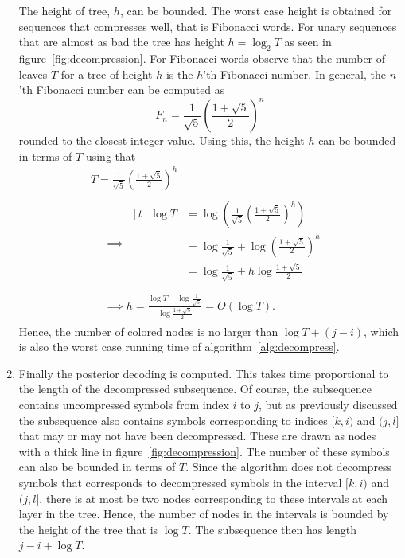\begin{enumerate}
  The height of tree, $h$, can be bounded. The worst case height is obtained
  for sequences that compresses well, that is Fibonacci words.  For unary
  sequences that are almost as bad the tree has height $h = \log_2 T$ as seen
  in figure~\ref{fig:decompression}. For Fibonacci words observe that the
  number of leaves $T$ for a tree of height $h$ is the $h$'th Fibonacci number.
  In general, the $n$'th Fibonacci number can be computed as
  \begin{equation*}
    F_n = \frac{1}{\sqrt{5}}
    {\left(
        \frac{1 + \sqrt{5}}{2}
      \right)}^n
  \end{equation*}
  rounded to the closest integer value. Using this, the height $h$ can be
  bounded in terms of $T$ using that
  \begin{gather*}
      T = \frac{1}{\sqrt{5}} {\left( \frac{1 + \sqrt{5}}{2} \right)}^h \\
      \begin{aligned}
        &\implies
        \begin{aligned}[t]
          \log T & = \log \left( \frac{1}{\sqrt{5}} {\left( \frac{1 + \sqrt{5}}{2} \right)}^h \right) \\
                 & = \log \frac{1}{\sqrt{5}} + \log {\left( \frac{1 + \sqrt{5}}{2} \right)}^h         \\
                 & = \log \frac{1}{\sqrt{5}} + h \log  \frac{1 + \sqrt{5}}{2}                         \\
        \end{aligned} \\
        &\implies h = \frac{\log T - \log \frac{1}{\sqrt{5}}}{\log \frac{1 + \sqrt{5}}{2}} = O\left(\log T\right).
      \end{aligned}
  \end{gather*}
  Hence, the number of colored nodes is no larger than $\log T + (j - i)$,
  which is also the worst case running time of algorithm~\ref{alg:decompress}.

\item Finally the posterior decoding is computed. This takes time proportional
  to the length of the decompressed subsequence. Of course, the subsequence
  contains uncompressed symbols from index $i$ to $j$, but as previously
  discussed the subsequence also contains  symbols corresponding to indices
  $[k, i)$ and $(j, l]$ that may or may not have been decompressed. These are
  drawn as nodes with a thick line in figure~\ref{fig:decompression}. The
  number of these symbols can also be bounded in terms of $T$. Since the
  algorithm does not decompress symbols that corresponds to decompressed
  symbols in the interval $[k, i)$ and $(j, l]$, there is at most be two nodes
  corresponding to these intervals at each layer in the tree. Hence, the number
  of nodes in the intervals is bounded by the height of the tree that is
  $\log T$. The subsequence then has length $j - i + \log T$.


\end{enumerate}
